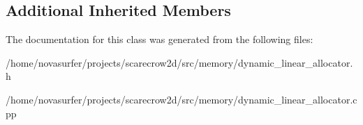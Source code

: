 \subsection*{Additional Inherited Members}


The documentation for this class was generated from the following files\+:\begin{DoxyCompactItemize}
\item 
/home/novasurfer/projects/scarecrow2d/src/memory/dynamic\+\_\+linear\+\_\+allocator.\+h\item 
/home/novasurfer/projects/scarecrow2d/src/memory/dynamic\+\_\+linear\+\_\+allocator.\+cpp\end{DoxyCompactItemize}
